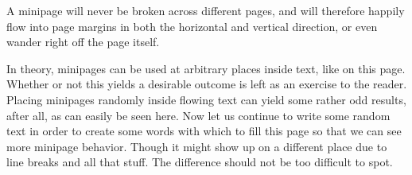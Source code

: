 \documentclass{article}
\begin{document}
\newpage
\noindent{}
\hspace{0.01\textwidth}
\noindent\begin{minipage}[t][][t]{0.32\textwidth}
        A  minipage will  never be  broken  across different  pages, and  will
        therefore happily  flow into page  margins in both the  horizontal and
        vertical direction, or even wander right off the page itself.
\end{minipage}
\hspace{0.01\textwidth}
\noindent{}

\newpage

In theory, minipages can be used at arbitrary places inside text, like on this
page.
Whether or not this  yields a desirable outcome is left as  an exercise to the
reader.  Placing minipages randomly inside  flowing text can yield some rather
odd results, after all, as can easily be seen here.
Now let us  continue to write some  random text in order to  create some words
with which to fill this page so that we can see more minipage behavior.
Though it might show  up on a different place due to line  breaks and all that
stuff.
The difference should not be too difficult to spot.

\end{document}
